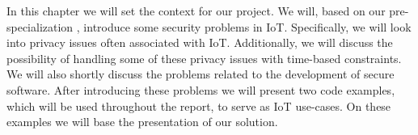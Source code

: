 In this chapter we will set the context for our project.
We will, based on our pre-specialization \cite{prespecialization}, introduce some security problems in IoT.
Specifically, we will look into privacy issues often associated with IoT.
Additionally, we will discuss the possibility of handling some of these privacy issues with time-based constraints.
We will also shortly discuss the problems related to the development of secure software.
After introducing these problems we will present two code examples, which will be used throughout the report, to serve as IoT use-cases.
On these examples we will base the presentation of our solution.
